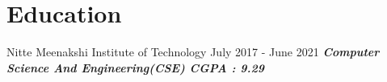 \section{\textbf{Education}}
{Nitte Meenakshi Institute of Technology \hspace{90mm} July 2017 - June 2021}
    \hspace{0.05cm} \textbf{ \textit{Computer Science And Engineering\textbf{(CSE) \hspace{109mm} \textbf{CGPA : 9.29}}}}